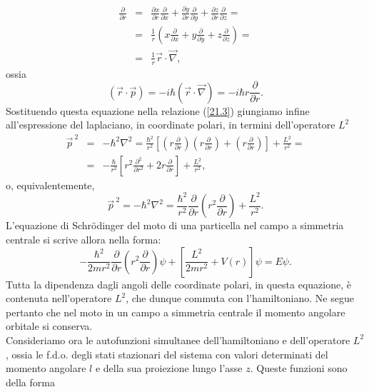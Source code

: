 \begin{eqnarray} 
\frac{\partial}{\partial r}&=&\frac{\partial x}{\partial r} \frac{\partial}{\partial x}+\frac{\partial y}{\partial r} \frac{\partial}{\partial y}+\frac{\partial z}{\partial r} \frac{\partial}{\partial z}= \nonumber \\
&=& \frac{1}{r}\left(x\frac{\partial}{\partial x}+y\frac{\partial}{\partial y}+z\frac{\partial}{\partial z}\right)= \nonumber \\
&=&\frac{1}{r}\vec{r}\cdot\vec{\nabla} ,
\end{eqnarray}
ossia
\begin{equation}
\left(\vec{r}\cdot\vec{p}\right)=-i\hbar\left(\vec{r}\cdot\vec{\nabla}\right)=-i\hbar r \frac{\partial}{\partial r} .
\end{equation}
Sostituendo questa equazione nella relazione (\ref{21.3}) giungiamo infine all'espressione del laplaciano, in coordinate polari, in termini dell'operatore $L^2$
\begin{eqnarray}
\vec{p}^{\ 2}&=&-\hbar^2\nabla^2=\frac{\hbar^2}{r^2}\left[\left(r\frac{\partial}{\partial r}\right)\left(r\frac{\partial}{\partial r}\right)+\left(r\frac{\partial}{\partial r}\right)\right]+\frac{L^2}{r^2}= \nonumber \\
&=& -\frac{\hbar}{r^2}\left[r^2\frac{\partial^2}{\partial r^2}+2r\frac{\partial}{\partial r}\right]+\frac{L^2}{r^2} ,
\end{eqnarray}
o, equivalentemente,
\begin{equation}
\vec{p}^{\ 2}=-\hbar^2\nabla^2=\frac{\hbar^2}{r^2}\frac{\partial}{\partial r}\left(r^2 \frac{\partial}{\partial r}\right)+\frac{L^2}{r^2} .
\end{equation}
L'equazione di Schr\"{o}dinger del moto di una particella nel campo a simmetria centrale si scrive allora nella forma:
\begin{equation}
-\frac{\hbar^2}{2mr^2}\frac{\partial}{\partial r}\left(r^2\frac{\partial}{\partial r}\right)\psi+\left[\frac{L^2}{2mr^2}+V\left(r\right)\right]\psi=E\psi .
\end{equation}
Tutta la dipendenza dagli angoli delle coordinate polari, in questa equazione, è contenuta nell'operatore $L^2$, che dunque commuta con l'hamiltoniano. Ne segue pertanto che nel moto in un campo a simmetria centrale il momento angolare orbitale si conserva.\\
Consideriamo ora le autofunzioni simultanee dell'hamiltoniano e dell'operatore $L^2$, ossia le f.d.o. degli stati stazionari del sistema con valori determinati del momento angolare $l$ e della sua proiezione lungo l'asse $z$. Queste funzioni sono della forma
